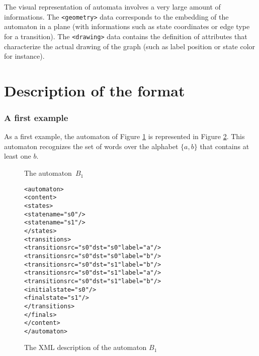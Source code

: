 \documentclass[a4paper]{article}
\newcommand{\medskipneg}{\vspace*{-2ex}} %
\newcommand{\contenttag}{\verb|<content>|\xpsace}
\newcommand{\statestag}{\verb|<states>|\xpsace}
\begin{document}
The visual representation of automata involves a very large amount of
informations.  The \verb|<geometry>| data corresponds to the embedding
of the automaton in a plane (with informations such as state
coordinates or edge type for a transition).  The \verb|<drawing>| data
contains the definition of attributes that characterize the actual
drawing of the graph (such as label position or state color for
instance). \\

\section{Description of the format}
\subsubsection{A first example}



As a first example, the automaton of Figure \ref{B1} is represented in
Figure \ref{B1xml}. This automaton recognizes the set of
words over the alphabet $\{a,b\}$ that contains at least one $b$.\\

\begin{figure}[ht]
\begin{center}
\end{center}
\vspace*{-.8cm}
\caption{The automaton~$B_1$}\label{B1}
\medskipneg
\end{figure}

{\small

\begin{figure}[h]
  \begin{center}
\begin{alltt}
<automaton>
  <content>
    <states>
       <state name="s0"/>
       <state name="s1"/>
    </states>
    <transitions>
       <transition src="s0" dst="s0" label="a"/>
       <transition src="s0" dst="s0" label="b"/>
       <transition src="s0" dst="s1" label="b"/>
       <transition src="s0" dst="s1" label="a"/>
       <transition src="s0" dst="s1" label="b"/>
       <initial state="s0"/>
       <final state="s1"/>
    </transitions>
    </finals>
  </content>
</automaton>
\end{alltt} 

\caption{The XML description of the automaton $B_1$}
\label{B1xml}
  \end{center}
\end{figure}
}
\end{document}
